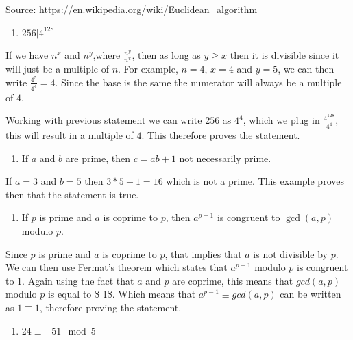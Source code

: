 \documentclass[11pt]{article}
\providecommand{\tightlist}{%
      \setlength{\itemsep}{0pt}\setlength{\parskip}{0pt}}
\begin{document}
Source: https://en.wikipedia.org/wiki/Euclidean\_algorithm

    \begin{enumerate}
\def\labelenumi{\alph{enumi})}
\setcounter{enumi}{1}
\tightlist
\item
  \(256 | 4^{128}\)
\end{enumerate}

    If we have \(n^{x}\) and \(n^{y}\),where \(\frac{n^{y}}{n^{x}}\), then
as long as \(y \geq x\) then it is divisible since it will just be a
multiple of \(n\). For example, \(n = 4\), \(x = 4\) and \(y = 5\), we
can then write \(\frac{4^{5}}{4^{4}} = 4\). Since the base is the same
the numerator will always be a multiple of \(4\).

Working with previous statement we can write \(256\) as \(4^{4}\), which
we plug in \(\frac{4^{128}}{4^{4}}\), this will result in a multiple of
\(4\). This therefore proves the statement.

    \begin{enumerate}
\def\labelenumi{\alph{enumi})}
\setcounter{enumi}{2}
\tightlist
\item
  If \(a\) and \(b\) are prime, then \(c=ab+1\) not necessarily prime.
\end{enumerate}

    If \(a = 3\) and \(b = 5\) then \(3 * 5 + 1 = 16\) which is not a prime.
This example proves then that the statement is true.

    \begin{enumerate}
\def\labelenumi{\alph{enumi})}
\setcounter{enumi}{3}
\tightlist
\item
  If \(p\) is prime and \(a\) is coprime to \(p\), then \(a^{p-1}\) is
  congruent to \(\gcd(a,p)\) modulo \(p\).
\end{enumerate}

    Since \(p\) is prime and \(a\) is coprime to \(p\), that implies that
\(a\) is not divisible by \(p\). We can then use Fermat's theorem which
states that \(a^{p - 1}\) modulo \(p\) is congruent to \(1\). Again
using the fact that \(a\) and \(p\) are coprime, this means that
\(gcd(a, p)\) modulo \(p\) is equal to \$ 1\$. Which means that
\(a^{p - 1} \equiv gcd(a, p)\) can be written as \(1 \equiv 1\),
therefore proving the statement.

    \begin{enumerate}
\def\labelenumi{\alph{enumi})}
\setcounter{enumi}{4}
\tightlist
\item
  \(24 \equiv -51 \mod 5\)
\end{enumerate}
\end{document}
